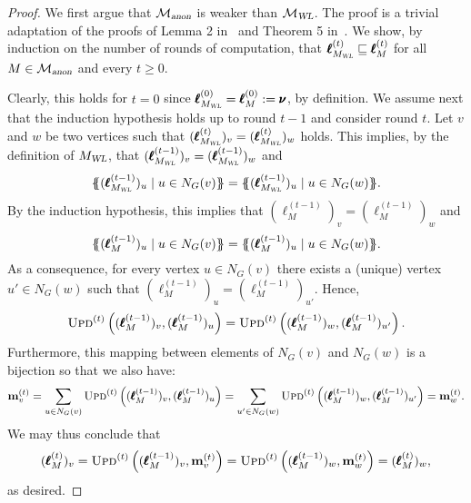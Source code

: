 \begin{proof}
We first argue that $\mathcal{M}_{\textsl{anon}}$ is weaker than $\mathcal{M}_{\textsl{WL}}$. The proof is a trivial adaptation of the proofs of Lemma 2 in~\cite{xhlj19} and Theorem 5 in~\cite{grohewl}. We show, by induction on the number of rounds of computation, that  $\pmb{\ell}_{M_{\textsl{WL}}}^{(t)}\sqsubseteq \pmb{\ell}_M^{(t)}$ for all $M \in \mathcal{M}_{\textsl{anon}}$ and every $t\geq 0$.

Clearly, this holds for $t=0$ since $\pmb{\ell}_{M_{\textsl{WL}}}^{(0)}=\pmb{\ell}_M^{(0)}:=\pmb{\nu}$, by definition.
We assume next that the induction hypothesis holds up to round $t-1$ and consider round $t$.
Let $v$ and $w$ be two vertices such that 
$(\pmb{\ell}_{M_{\textsl{WL}}}^{(t)})_v=(\pmb{\ell}_{M_{\textsl{WL}}}^{(t)})_w$ holds.
This implies, by the definition of $M_{\textsl{WL}}$, that $(\pmb{\ell}_{M_{\textsl{WL}}}^{(t-1)})_v=(\pmb{\ell}_{M_{\textsl{WL}}}^{(t-1)})_w$  and
$$
\ldbl (\pmb{\ell}_{M_{\textsl{WL}}}^{(t-1)})_u\mid u\in N_G(v) \rdbl=
\ldbl (\pmb{\ell}_{M_{\textsl{WL}}}^{(t-1)})_u\mid u\in N_G(w) \rdbl.
$$
By the induction hypothesis, this implies that 
$(\pmb{\ell}_{M}^{(t-1)})_v=(\pmb{\ell}_{M}^{(t-1)})_w$  and
$$
\ldbl (\pmb{\ell}_{M}^{(t-1)})_u\mid u\in N_G(v) \rdbl=
\ldbl (\pmb{\ell}_{M}^{(t-1)})_u\mid u\in N_G(w) \rdbl.
$$
As a consequence, for every vertex $u\in N_G(v)$ there exists a (unique) vertex $u'\in N_G(w)$ such that $(\pmb{\ell}_{M}^{(t-1)})_u=(\pmb{\ell}_{M}^{(t-1)})_{u'}$. Hence,
$$
\textsc{Upd}^{(t)}\left((\pmb{\ell}_{M}^{(t-1)})_v,(\pmb{\ell}_{M}^{(t-1)})_u\right)=
\textsc{Upd}^{(t)}\left((\pmb{\ell}_{M}^{(t-1)})_w,(\pmb{\ell}_{M}^{(t-1)})_{u'}\right).
$$
Furthermore, this mapping between elements of $N_G(v)$ and $N_G(w)$ is a bijection so that we also have:
$$
\mathbf{m}^{(t)}_v=\sum_{u\in N_G(v)}\textsc{Upd}^{(t)}\left((\pmb{\ell}_{M}^{(t-1)})_v,(\pmb{\ell}_{M}^{(t-1)})_u\right)=\sum_{u'\in N_G(w)}\textsc{Upd}^{(t)}\left((\pmb{\ell}_{M}^{(t-1)})_w,(\pmb{\ell}_{M}^{(t-1)})_{u'}\right)=\mathbf{m}^{(t)}_w.
$$
We may thus conclude that $$(\pmb{\ell}_{M}^{(t)})_v=\textsc{Upd}^{(t)}\left((\pmb{\ell}_{M}^{(t-1)})_v,\mathbf{m}^{(t)}_v\right)=\textsc{Upd}^{(t)}\left((\pmb{\ell}_{M}^{(t-1)})_w,\mathbf{m}^{(t)}_w\right)=(\pmb{\ell}_{M}^{(t)})_w,
$$
as desired.
%

\end{proof}
